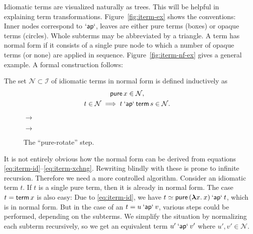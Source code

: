 Idiomatic terms are visualized naturally as trees.
This will be helpful in explaining term transformations.
Figure~\ref{fig:iterm-ex} shows the conventions:
Inner nodes correspond to $\mathbin{\mathsf{`ap`}}$, leaves are either pure terms (boxes) or
opaque terms (circles).
Whole subterms may be abbreviated by a triangle.
A term has normal form if it consists of a single pure node to which a number
of opaque terms (or none) are applied in sequence.
Figure~\ref{fig:iterm-nf-ex} gives a general example.
A formal construction follows:

\begin{definition}
The set $\mathcal{N} \subset \mathcal{I}$ of idiomatic terms in normal form is
defined inductively as
\begin{gather}
	\operatorname{\mathsf{pure}} x \in \mathcal{N}, \label{eq:nf-base}\\
	t \in \mathcal{N} \implies t \mathbin{\mathsf{`ap`}} \operatorname{\mathsf{term}} s \in \mathcal{N}. \label{eq:nf-step}
\end{gather}
\end{definition}

\begin{figure}\centering
{}
$\to$
$\to$
\caption{The ``pure-rotate'' step.}
\label{fig:pure-rotate}
\end{figure}

It is not entirely obvious how the normal form can be derived from equations
\eqref{eq:iterm-id}--\eqref{eq:iterm-xchng}.
Rewriting blindly with these is prone to infinite recursion.
Therefore we need a more controlled algorithm.
Consider an idiomatic term $t$.
If $t$ is a single pure term, then it is already in normal form.
The case $t = \operatorname{\mathsf{term}} x$ is also easy:
Due to \eqref{eq:iterm-id}, we have $t \simeq \operatorname{\mathsf{pure}}{({\boldsymbol\lambda} x.\>x)} \mathbin{\mathsf{`ap`}} t$,
which is in normal form.
But in the case of an $t = u \mathbin{\mathsf{`ap`}} v$, various steps could be performed,
depending on the subterms.
We simplify the situation by normalizing each subterm recursively, so we get
an equivalent term $u' \mathbin{\mathsf{`ap`}} v'$ where $u',v' \in \mathcal{N}$.

